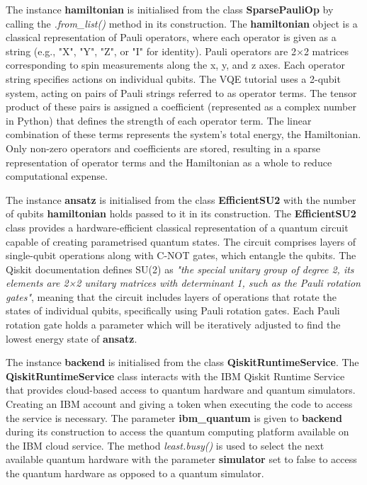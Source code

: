 \documentclass{article}
\begin{document}
{The instance \textbf{hamiltonian} is initialised from the class \textbf{SparsePauliOp} by calling the \textit{.from\_list()} method in its construction. The \textbf{hamiltonian} object is a classical representation of Pauli operators, where each operator is given as a string (e.g., "X", "Y", "Z", or "I" for identity). Pauli operators are 2×2 matrices corresponding to spin measurements along the x, y, and z axes\cite{DJORDJEVIC201229}. Each operator string specifies actions on individual qubits. The VQE tutorial uses a 2-qubit system, acting on pairs of Pauli strings referred to as operator terms. The tensor product of these pairs is assigned a coefficient (represented as a complex number in Python) that defines the strength of each operator term. The linear combination of these terms represents the system's total energy, the Hamiltonian. Only non-zero operators and coefficients are stored, resulting in a sparse representation of operator terms and the Hamiltonian as a whole to reduce computational expense.

The instance \textbf{ansatz} is initialised from the class \textbf{EfficientSU2} with the number of qubits \textbf{hamiltonian} holds passed to it in its construction. The \textbf{EfficientSU2} class provides a hardware-efficient classical representation of a quantum circuit capable of creating parametrised quantum states. The circuit comprises layers of single-qubit operations along with C-NOT gates, which entangle the qubits. The Qiskit documentation defines SU(2) as \textit{"the special unitary group of degree 2, its elements are 2×2 unitary matrices with determinant 1, such as the Pauli rotation gates"}\cite{EfficientSU2}, meaning that the circuit includes layers of operations that rotate the states of individual qubits, specifically using Pauli rotation gates. Each Pauli rotation gate holds a parameter which will be iteratively adjusted to find the lowest energy state of \textbf{ansatz}.

The instance \textbf{backend} is initialised from the class \textbf{QiskitRuntimeService}. The \textbf{QiskitRuntimeService} class interacts with the IBM Qiskit Runtime Service that provides cloud-based access to quantum hardware and quantum simulators. Creating an IBM account and giving a token when executing the code to access the service is necessary. The parameter \textbf{ibm\_quantum} is given to \textbf{backend} during its construction to access the quantum computing platform available on the IBM cloud service. The method \textit{least.busy()} is used to select the next available quantum hardware with the parameter \textbf{simulator} set to false to access the quantum hardware as opposed to a quantum simulator. 

}
\end{document}

